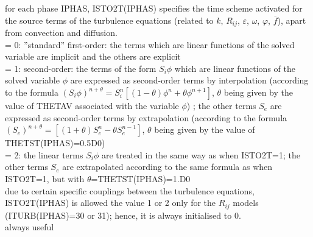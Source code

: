 {for each phase IPHAS, ISTO2T(IPHAS) specifies the time scheme activated
for the source terms of the turbulence equations (related to $k$,
$R_{ij}$, $\varepsilon$, $\omega$, $\varphi$, $\overline{f}$), apart
from convection and diffusion.\\
\hspace*{1.3cm}= 0: ''standard'' first-order: the terms which are linear
functions of the solved variable are implicit and the others are explicit\\
\hspace*{1.3cm}= 1: second-order: the terms of the form $S_i\phi$ which are
linear functions of the solved variable
$\phi$ are expressed as second-order terms by interpolation (according
to the formula
$(S_i\phi)^{n+\theta}=S_i^n[(1-\theta)\phi^n+\theta\phi^{n+1}]$, $\theta$
being given by the value of THETAV associated with the variable $\phi$)
; the other terms $S_e$ are expressed as second-order terms by
extrapolation (according to the formula
$(S_e)^{n+\theta}=[(1+\theta)S_e^n-\theta S_e^{n-1}]$, $\theta$ being
given by the value of THETST(IPHAS)=0.5D0)\\
\hspace*{1.3cm}= 2: the linear terms $S_i\phi$ are treated in the same
way as when ISTO2T=1;
the other terms $S_e$ are extrapolated according to the same formula
as when ISTO2T=1, but with $\theta$=THETST(IPHAS)=1.D0\\
due to certain specific couplings between the turbulence equations,
ISTO2T(IPHAS) is allowed the value 1 or 2 only for the $R_{ij}$ models
(ITURB(IPHAS)=30 or 31); hence, it is always initialised to 0.\\
always useful}


